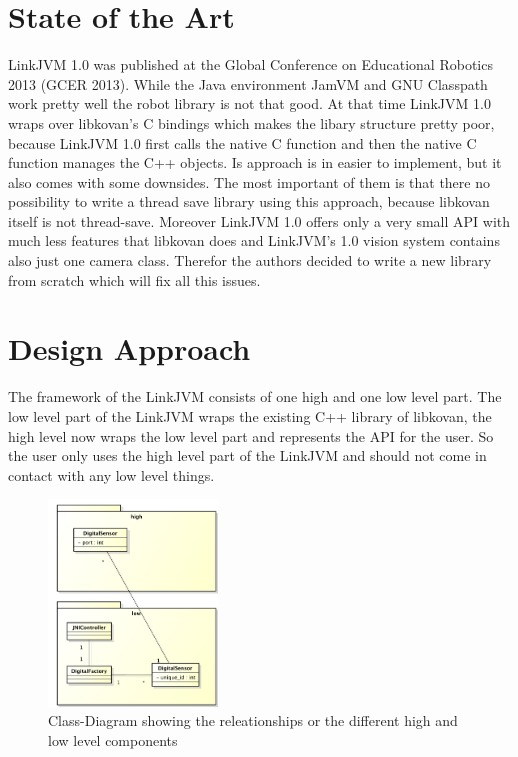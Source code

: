 \documentclass{juniorjournal}
\begin{document}
\section{State of the Art}
LinkJVM 1.0\cite{linkjvm1.0} was published at the Global Conference on Educational Robotics 2013 (GCER\cite{GCER} 2013).
While the Java\cite{Java} environment JamVM and GNU Classpath\cite{GNU} work pretty well the robot library is not that good.
At that time LinkJVM 1.0\cite{linkjvm1.0} wraps over libkovan's\cite{libkovan} C bindings which makes the libary structure pretty poor, because LinkJVM 1.0\cite{linkjvm1.0} first calls the native C function and then the native C function manages the C++ objects.
Is approach is in easier to implement, but it also comes with some downsides.
The most important of them is that there no possibility to write a thread save library using this approach, because libkovan\cite{libkovan} itself is not thread-save.
Moreover LinkJVM 1.0\cite{linkjvm1.0} offers only a very small API with much less features that libkovan\cite{libkovan} does and LinkJVM's 1.0\cite{linkjvm1.0} vision system contains also just one camera class.
Therefor the authors decided to write a new library from scratch which will fix all this issues. 

\section{Design Approach}
\label{sec:design-approach}
The framework of the LinkJVM consists of one high and one low level part.
The low level part of the LinkJVM wraps the existing C++ library of libkovan\cite{libkovan}, 
the high level now wraps the low level part and represents the API for the user.
So the user only uses the high level part of the LinkJVM and should not come in 
contact with any low level things.

\begin{figure}[H]
\centering
\includegraphics[width=0.4\textwidth]{images/Class-Diagram.pdf}
\caption{Class-Diagram showing the releationships or the different high and low level components}
\label{fig:Class-Diagram}
\end{figure}
\end{document}
